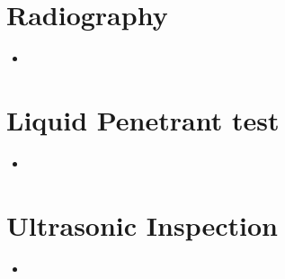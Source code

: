\documentclass[8pt]{report}
\begin{document}
\section{Radiography}
	\begin{itemize}
		\item
	\end{itemize}\hrulefill
\section{Liquid Penetrant test}
	\begin{itemize}
		\item
	\end{itemize}\hrulefill
\section{Ultrasonic Inspection}
	\begin{itemize}
		\item
	\end{itemize}\hrulefill
\end{document}
